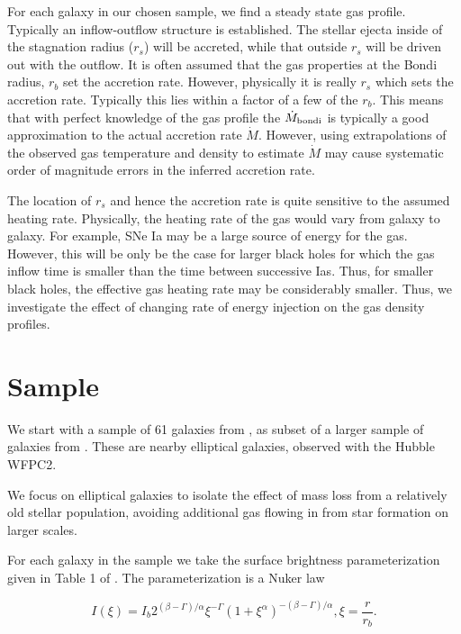\documentclass[usenatbib,fleqn]{mn2e}
\newcommand{\Mdot}{\dot{M}}
\newcommand{\Mdotb}{\dot{M}_{\rm bondi}}
\newcommand{\rs}{r_s}
\newcommand{\rb}{r_b}
\begin{document}
For each galaxy in our chosen sample, we find a steady state gas profile. Typically an inflow-outflow structure is established. The stellar ejecta inside of the stagnation radius ($\rs$) will be accreted, while that outside $\rs$ will be driven out with the outflow.  It is often assumed that the gas properties at the Bondi radius, $\rb$ set the accretion rate. However, physically it is really $\rs$ which sets the accretion rate. Typically this lies within a factor of a few of the $\rb$.  This means that with perfect knowledge of the gas profile the $\Mdotb$ is typically a good approximation to the actual accretion rate $\Mdot$.  However, using extrapolations of the observed gas temperature and density to estimate $\Mdot$ may cause systematic order of magnitude errors in the inferred  accretion rate. 

The location of $\rs$ and hence the accretion rate is  quite sensitive to the assumed heating rate.  Physically, the heating rate of the gas would vary from galaxy to galaxy. For example, SNe Ia may be a large source of energy for the gas. However, this will be only be the case for larger black holes for which the gas inflow time is smaller than the time between successive Ias. Thus, for smaller black holes, the effective gas heating rate may be considerably smaller. Thus, we investigate the effect of changing rate of energy injection on the gas density profiles. 



\section{Sample}
We start with a sample of 61 galaxies from , as subset of a larger sample of galaxies from \citealt{FaberTremaine+:1997a}. These are nearby elliptical galaxies, observed with the Hubble WFPC2.

We focus on elliptical galaxies to isolate the effect of mass loss from a relatively old stellar population, avoiding additional gas flowing in from star formation on larger scales. 

For each galaxy in the sample we take the surface brightness parameterization given in Table 1 of  . The parameterization is a Nuker law

\begin{equation}
I(\xi)=I_b 2^{(\beta-\Gamma)/\alpha} \xi^{-\Gamma} (1+\xi^\alpha)^{-(\beta-\Gamma)/\alpha}, \xi=\frac{r}{r_b}.
\end{equation}
\end{document}
